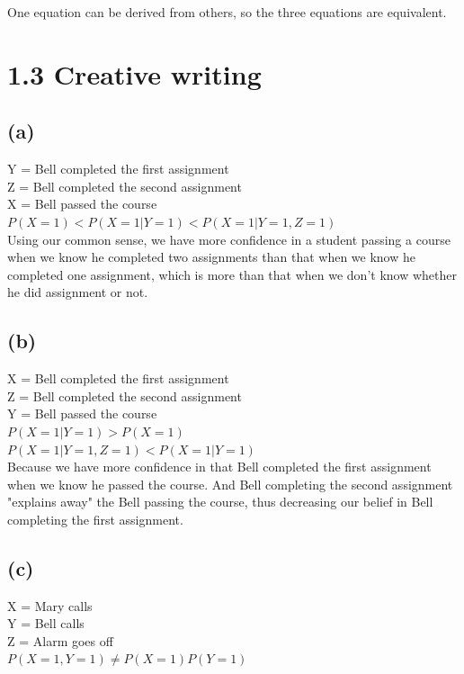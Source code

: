 \documentclass [11pt, a4paper, oneside] {article}
\begin{document}
One equation can be derived from others, so the three equations are equivalent.
\section *{1.3 Creative writing}
\subsection *{(a)}
Y = Bell completed the first assignment\\
Z = Bell completed the second assignment\\
X = Bell passed the course\\

$P(X = 1) < P(X=1|Y=1) < P(X = 1|Y=1, Z=1)$\\

Using our common sense, we have more confidence in a student passing a course when we know he completed two assignments than that when we know he completed one assignment, which is more than that when we don't know whether he did assignment or not.\\
\subsection *{(b)}
X = Bell completed the first assignment\\
Z = Bell completed the second assignment\\
Y = Bell passed the course\\

$P(X=1|Y=1) > P(X=1)$\\

$P(X=1|Y=1, Z=1) < P(X=1|Y=1)$\\

Because we have more confidence in that Bell completed the first assignment when we know he passed the course. And Bell completing the second assignment "explains away" the Bell passing the course, thus decreasing our belief in Bell completing the first assignment.\\
\subsection *{(c)}
X = Mary calls \\
Y = Bell calls \\ 
Z = Alarm goes off \\

$P(X=1, Y=1) \neq P(X=1)P(Y=1)$\\
\end{document}
